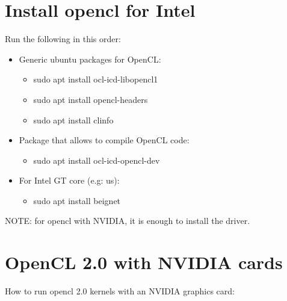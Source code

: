 \documentclass[a4paper]{article}
\begin{document}
\section*{Install opencl for Intel}
Run the following in this order:
\begin{itemize}
\item  Generic ubuntu packages for OpenCL:
  \begin{itemize}
  \item sudo apt install ocl-icd-libopencl1
  \item sudo apt install opencl-headers
  \item sudo apt install clinfo
  \end{itemize}
\item Package that allows to compile OpenCL code:
   \begin{itemize}
   \item sudo apt install ocl-icd-opencl-dev
   \end{itemize}
\item For Intel GT core (e.g: us):
  \begin{itemize}
   \item sudo apt install beignet
   \end{itemize}
 \end{itemize}
NOTE: for opencl with NVIDIA, it is enough to install the driver.

\section*{OpenCL 2.0 with NVIDIA cards}
How to run opencl 2.0 kernels with an NVIDIA graphics card:
\end{document}
